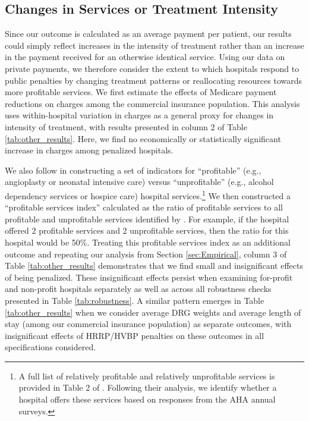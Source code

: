 \documentclass[12pt]{article}
\begin{document}
\subsection{Changes in Services or Treatment Intensity}
Since our outcome is calculated as an average payment per patient, our results could simply reflect increases in the intensity of treatment rather than an increase in the payment received for an otherwise identical service.  Using our data on private payments, we therefore consider the extent to which hospitals respond to public penalties by changing treatment patterns or reallocating resources towards more profitable services. We first estimate the effects of Medicare payment reductions on charges among the commercial insurance population. This analysis uses within-hospital variation in charges as a general proxy for changes in intensity of treatment, with results presented in column 2 of Table \ref{tab:other_results}. Here, we find no economically or statistically significant increase in charges among penalized hospitals.

We also follow \cite{horwitz2009} in constructing a set of indicators for ``profitable'' (e.g., angioplasty or neonatal intensive care) versus ``unprofitable'' (e.g., alcohol dependency services or hospice care) hospital services.\footnote{A full list of relatively profitable and relatively unprofitable services is provided in Table 2 of \cite{horwitz2009}. Following their analysis, we identify whether a hospital offers these services based on responses from the AHA annual surveys.} We then constructed a ``profitable services index'' calculated as the ratio of profitable services to all profitable and unprofitable services identified by \cite{horwitz2009}. For example, if the hospital offered 2 profitable services and 2 unprofitable services, then the ratio for this hospital would be 50\%. Treating this profitable services index as an additional outcome and repeating our analysis from Section \ref{sec:Empirical}, column 3 of Table \ref{tab:other_results} demonstrates that we find small and insignificant effects of being penalized. These insignificant effects persist when examining for-profit and non-profit hospitals separately as well as across all robustness checks presented in Table \ref{tab:robustness}. A similar pattern emerges in Table \ref{tab:other_results} when we consider average DRG weights and average length of stay (among our commercial insurance population) as separate outcomes, with insignificant effects of HRRP/HVBP penalties on these outcomes in all specifications considered.
\end{document}
